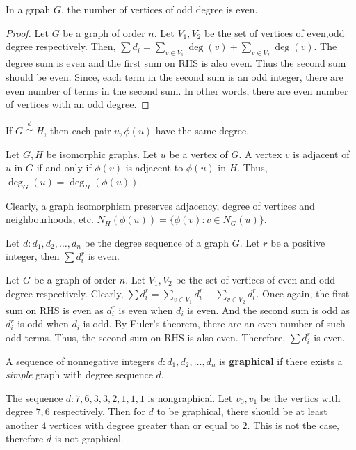 \begin{corollary}
	In a grpah $G$, the number of vertices of odd degree is even.
\end{corollary}
\begin{proof}
	Let $G$ be a graph of order $n$.
	Let $V_1,V_2$ be the set of vertices of even,odd degree respectively.
	Then, $\sum d_i = \sum_{v \in V_1} \deg(v) + \sum_{v \in V_2} \deg(v)$.
	The degree sum is even and the first sum on RHS is also even. Thus the second sum should be even. Since, each term in the second sum is an odd integer, there are even number of terms in the second sum. In other words, there are even number of vertices with an odd degree.
\end{proof}
\begin{exercise} 
	If $G \overset{\phi}{\cong} H$, then each pair $u,\phi(u)$ have the same degree.
\end{exercise}
Let $G,H$ be isomorphic graphs.
Let $u$ be a vertex of $G$.
A vertex $v$ is adjacent of $u$ in $G$ if and only if $\phi(v)$ is adjacent to $\phi(u)$ in $H$. Thus, $\deg_G(u) = \deg_H(\phi(u))$.

\begin{remark}
	Clearly, a graph isomorphism preserves adjacency, degree of vertices and neighbourhoods, etc.
	$N_H(\phi(u)) = \{ \phi(v) : v \in N_G(u) \}$.
\end{remark}

\begin{exercise}
	Let $d : d_1,d_2,\dots,d_n$ be the degree sequence of a graph $G$.
	Let $r$ be a positive integer, then $\sum d_i^r$ is even.
\end{exercise}
Let $G$ be a graph of order $n$.
Let $V_1,V_2$ be the set of vertices of even and odd degree respectively.
Clearly, $\sum d_i^r = \sum_{v \in V_1} d_i^r + \sum_{v \in V_2} d_i^r$.
Once again, the first sum on RHS is even as $d_i^r$ is even when $d_i$ is even. And the second sum is odd as $d_i^r$ is odd when $d_i$ is odd. By Euler's theorem, there are an even number of such odd terms. Thus, the second sum on RHS is also even. Therefore, $\sum d_i^r$ is even.

\begin{definition}
	A sequence of nonnegative integers $d : d_1,d_2,\dots,d_n$ is \textbf{graphical} if there exists a \textit{simple} graph with degree sequence $d$.
\end{definition}

\begin{example}
	The sequence $d : 7,6,3,3,2,1,1,1$ is nongraphical. Let $v_0,v_1$ be the vertics with degree $7,6$ respectively. Then for $d$ to be graphical, there should be at least another $4$ vertices with degree greater than or equal to $2$.
	This is not the case, therefore $d$ is not graphical.
\end{example}

